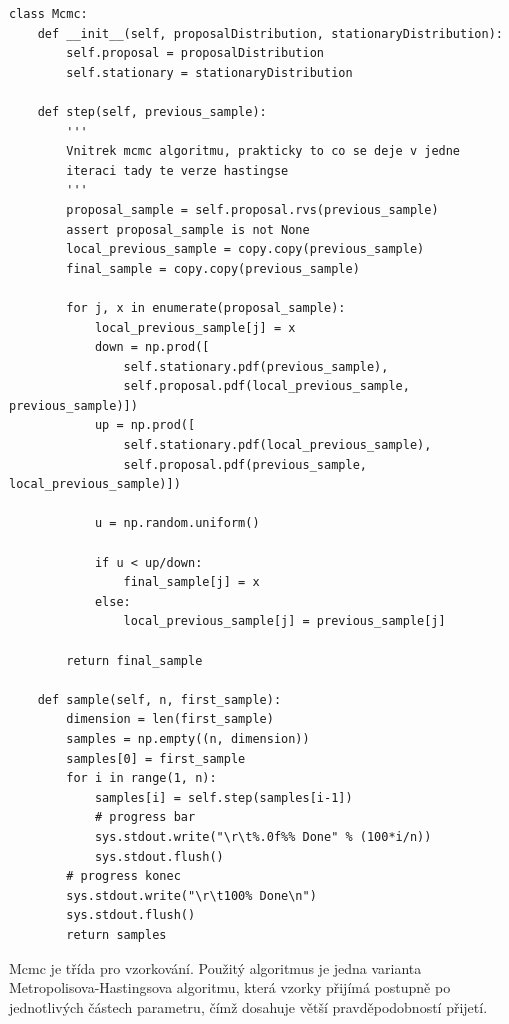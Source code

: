 \documentclass[czech,master,public,dept470,male,cpdeclaration,oneside, python]{diploma}
\begin{document}
\begin{lstlisting}[caption=Vzorkovač]
class Mcmc:
    def __init__(self, proposalDistribution, stationaryDistribution):
        self.proposal = proposalDistribution
        self.stationary = stationaryDistribution

    def step(self, previous_sample):
        '''
        Vnitrek mcmc algoritmu, prakticky to co se deje v jedne 
        iteraci tady te verze hastingse
        '''
        proposal_sample = self.proposal.rvs(previous_sample)
        assert proposal_sample is not None
        local_previous_sample = copy.copy(previous_sample)
        final_sample = copy.copy(previous_sample)

        for j, x in enumerate(proposal_sample):
            local_previous_sample[j] = x
            down = np.prod([
                self.stationary.pdf(previous_sample),
                self.proposal.pdf(local_previous_sample, previous_sample)])
            up = np.prod([
                self.stationary.pdf(local_previous_sample),
                self.proposal.pdf(previous_sample, local_previous_sample)])

            u = np.random.uniform()

            if u < up/down:
                final_sample[j] = x
            else:
                local_previous_sample[j] = previous_sample[j]

        return final_sample

    def sample(self, n, first_sample):
        dimension = len(first_sample)
        samples = np.empty((n, dimension))
        samples[0] = first_sample
        for i in range(1, n):
            samples[i] = self.step(samples[i-1])
            # progress bar
            sys.stdout.write("\r\t%.0f%% Done" % (100*i/n))
            sys.stdout.flush()
        # progress konec
        sys.stdout.write("\r\t100% Done\n")
        sys.stdout.flush()
        return samples
\end{lstlisting}

Mcmc je třída pro vzorkování. Použitý algoritmus je jedna varianta Metropolisova-Hastingsova algoritmu, která vzorky přijímá postupně po jednotlivých částech parametru, čímž dosahuje větší pravděpodobností přijetí. 
\end{document}
